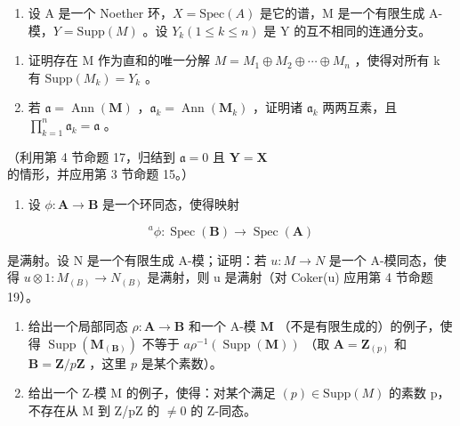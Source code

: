 \begin{enumerate}
\def\labelenumi{\arabic{enumi}.}
\setcounter{enumi}{24}
\tightlist
\item
  设 A 是一个 Noether 环，\(X = \text{Spec}(A)\) 是它的谱，M 是一个有限生成 A-模，\(Y = \text{Supp}(M)\) 。设 \(Y_k (1 \leqslant k \leqslant n)\) 是 Y 的互不相同的连通分支。
\end{enumerate}

\begin{enumerate}
\def\labelenumi{(\alph{enumi})}
\item
  证明存在 M 作为直和的唯一分解 \(M = M_{1} \oplus M_{2} \oplus \cdots \oplus M_{n}\) ，使得对所有 k 有 \(\text{Supp}(M_{k}) = Y_{k}\) 。
\item
  若 \(\mathfrak{a} = \operatorname{Ann}(\mathbf{M})\) ，\(\mathfrak{a}_k = \operatorname{Ann}(\mathbf{M}_k)\) ，证明诸 \(\mathfrak{a}_k\) 两两互素，且 \(\prod_{k=1}^{n} \mathfrak{a}_k = \mathfrak{a}\) 。
\end{enumerate}

（利用第 4 节命题 17，归结到 \(\mathfrak{a} = 0\) 且 \(\mathbf{Y} = \mathbf{X}\) 的情形，并应用第 3 节命题 15。）

\begin{enumerate}
\def\labelenumi{\arabic{enumi}.}
\setcounter{enumi}{25}
\tightlist
\item
  设 \(\phi: \mathbf{A} \to \mathbf{B}\) 是一个环同态，使得映射
\end{enumerate}

\[
^ {a} \phi : \operatorname{Spec} (\mathbf {B}) \rightarrow \operatorname{Spec} (\mathbf {A})
\]

是满射。设 N 是一个有限生成 A-模；证明：若 \(u: M \to N\) 是一个 A-模同态，使得 \(u \otimes 1: M_{(B)} \to N_{(B)}\) 是满射，则 u 是满射（对 Coker(u) 应用第 4 节命题 19）。

\begin{enumerate}
\def\labelenumi{\arabic{enumi}.}
\setcounter{enumi}{26}
\item
  给出一个局部同态 \(\rho: \mathbf{A} \to \mathbf{B}\) 和一个 A-模 \(\mathbf{M}\) （不是有限生成的）的例子，使得 \(\operatorname{Supp}(\mathbf{M}_{(\mathbf{B})})\) 不等于 \(a\rho^{-1}(\operatorname{Supp}(\mathbf{M}))\) （取 \(\mathbf{A} = \mathbf{Z}_{(p)}\) 和 \(\mathbf{B} = \mathbf{Z}/p\mathbf{Z}\) ，这里 \(p\) 是某个素数）。
\item
  给出一个 Z-模 M 的例子，使得：对某个满足 \((p) \in \text{Supp}(M)\) 的素数 p，不存在从 M 到 Z/pZ 的 \(\neq 0\) 的 Z-同态。
\end{enumerate}

